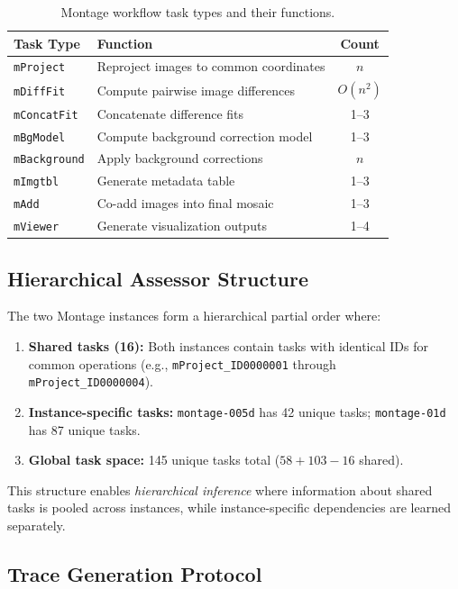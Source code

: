 \begin{table}[htbp]
\caption{Montage workflow task types and their functions.}
\label{tab:montage_tasks}
\centering
\small
\begin{tabular}{llc}
\toprule
\textbf{Task Type} & \textbf{Function} & \textbf{Count} \\
\midrule
\texttt{mProject} & Reproject images to common coordinates & $n$ \\
\texttt{mDiffFit} & Compute pairwise image differences & $O(n^2)$ \\
\texttt{mConcatFit} & Concatenate difference fits & 1--3 \\
\texttt{mBgModel} & Compute background correction model & 1--3 \\
\texttt{mBackground} & Apply background corrections & $n$ \\
\texttt{mImgtbl} & Generate metadata table & 1--3 \\
\texttt{mAdd} & Co-add images into final mosaic & 1--3 \\
\texttt{mViewer} & Generate visualization outputs & 1--4 \\
\bottomrule
\end{tabular}
\end{table}

\subsection{Hierarchical Assessor Structure}

The two Montage instances form a hierarchical partial order where:

\begin{enumerate}[leftmargin=*,nosep]
    \item \textbf{Shared tasks (16):} Both instances contain tasks with identical IDs for common operations (e.g., \texttt{mProject\_ID0000001} through \texttt{mProject\_ID0000004}).
    \item \textbf{Instance-specific tasks:} \texttt{montage-005d} has 42 unique tasks; \texttt{montage-01d} has 87 unique tasks.
    \item \textbf{Global task space:} 145 unique tasks total ($58 + 103 - 16$ shared).
\end{enumerate}

This structure enables \emph{hierarchical inference} where information about shared tasks is pooled across instances, while instance-specific dependencies are learned separately.

\subsection{Trace Generation Protocol}

